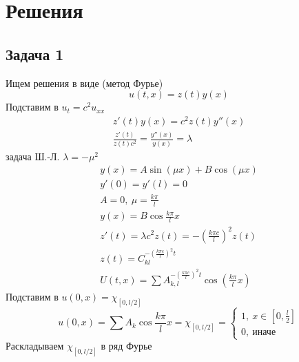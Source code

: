 
\newpage
\section*{Решения}
\subsection*{Задача 1}
	Ищем решения в виде (метод Фурье)
	\begin{equation*}
		u(t,x) = z(t)y(x)
	\end{equation*}
	Подставим в $u_{t} = c^2 u_{xx}$
	\begin{gather*}
		z'(t)y(x) = c^2 z(t) y''(x)\\
		\frac{z'(t)}{z(t)c^2} = \frac{y''(x)}{y(x)} = \lambda
	\end{gather*}
	задача Ш.-Л. $\lambda = -\mu^2$
	\begin{gather*}
		y(x) = A \sin(\mu x) + B \cos(\mu x)\\
		y'(0) = y'(l) = 0\\
		A = 0,\ \mu = \frac{k \pi}{l}\\
		y(x) = B \cos \frac{k \pi}{l} x\\
		z'(t) = \lambda c^2 z(t) = -\left(\frac{k \pi c}{l}\right)^2 z(t)\\
		z(t) = C_{kl}^{-\left(\frac{k \pi c}{l}\right)^2 t}\\
		U(t,x) = \sum A_{k,l}^{-\left(\frac{k \pi c}{l}\right)^2 t} \cos \left(\frac{k \pi}{l}x\right)
	\end{gather*}
	Подставим в $u(0,x) = \chi_{[0,l/2]}$
	\begin{equation*}
		u(0,x) = \sum A_{k} \cos \frac{k \pi}{l} x = \chi_{[0,l/2]} =
		\begin{cases}
			1,\ x \in \left[0, \frac{l}{2}\right]\\
			0,\ \text{иначе}
		\end{cases}
	\end{equation*}
	Раскладываем $\chi_{[0,l/2]}$ в ряд Фурье
